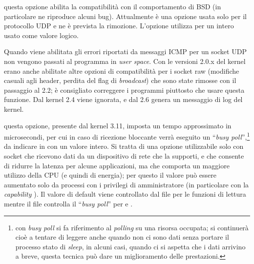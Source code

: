 \begin{basedescript}{\desclabelwidth{2.2cm}\desclabelstyle{\nextlinelabel}}
\item[\constd{SO\_BSDCOMPAT}] questa opzione abilita la compatibilità con il
  comportamento di BSD (in particolare ne riproduce alcuni bug).  Attualmente
  è una opzione usata solo per il protocollo UDP e ne è prevista la rimozione.
  L'opzione utilizza per  un intero usato come valore logico.

  Quando viene abilitata gli errori riportati da messaggi ICMP per un socket
  UDP non vengono passati al programma in \textit{user space}. Con le versioni
  2.0.x del kernel erano anche abilitate altre opzioni di compatibilità per i
  socket raw (modifiche casuali agli header, perdita del flag di
  \textit{broadcast}) che sono state rimosse con il passaggio al 2.2; è
  consigliato correggere i programmi piuttosto che usare questa funzione. Dal
  kernel 2.4 viene ignorata, e dal 2.6 genera un messaggio di log del kernel.

\item[\constd{SO\_BUSY\_POLL}] questa opzione, presente dal kernel 3.11,
  imposta un tempo approssimato in microsecondi, per cui in caso di ricezione
  bloccante verrà eseguito un  ``\textit{busy
    poll}'',\footnote{con \textit{busy poll} si fa riferimento al
    \textit{polling} su una risorsa occupata; si continuerà cioè a tentare di
    leggere anche quando non ci sono dati senza portare il processo stato di
    \textit{sleep}, in alcuni casi, quando ci si aspetta che i dati arrivino a
    breve, questa tecnica può dare un miglioramento delle prestazioni.}  da
  indicare in  con un valore intero. Si tratta di una opzione
  utilizzabile solo con socket che ricevono dati da un dispositivo di rete che
  la supporti, e che consente di ridurre la latenza per alcune applicazioni,
  ma che comporta un maggiore utilizzo della CPU (e quindi di energia); per
  questo il valore può essere aumentato solo da processi con i privilegi di
  amministratore (in particolare con la \textit{capability}
  ).  Il valore di default viene controllato dal file
   per le funzioni di lettura mentre il
  file  controlla il ``\textit{busy
    poll}'' per  e .


\end{basedescript}
